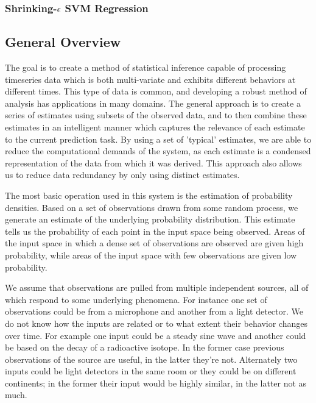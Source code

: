 \documentclass[10pt]{article}
\begin{document}
\subsubsection{Shrinking-\(\epsilon\) SVM Regression}


\subsection{General Overview}
The goal is to create a method of statistical inference capable of processing timeseries data which is both multi-variate and exhibits different behaviors at different times.  This type of data is common, and developing a robust method of analysis has applications in many domains.  The general approach is to create a series of estimates using subsets of the observed data, and to then combine these estimates in an intelligent manner which captures the relevance of each estimate to the current prediction task.  By using a set of 'typical' estimates, we are able to reduce the computational demands of the system, as each estimate is a condensed representation of the data from which it was derived.  This approach also allows us to reduce data redundancy by only using distinct estimates.

The most basic operation used in this system is the estimation of probability densities.  Based on a set of observations drawn from some random process, we generate an estimate of the underlying probability distribution.  This estimate tells us the probability of each point in the input space being observed.  Areas of the input space in which a dense set of observations are observed are given high probability, while areas of the input space with few observations are given low probability.

We assume that observations are pulled from multiple independent sources, all of which respond to some underlying phenomena.  For instance one set of observations could be from a microphone and another from a light detector.  We do not know how the inputs are related or to what extent their behavior changes over time.  For example one input could be a steady sine wave and another could be based on the decay of a radioactive isotope.  In the former case previous observations of the source are useful, in the latter they're not.  Alternately two inputs could be light detectors in the same room or they could be on different continents; in the former their input would be highly similar, in the latter not as much.
\end{document}
